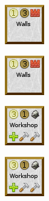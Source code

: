 \documentclass{article}
\begin{document}
\begin{figure}
\begin{subfigure}{}
    \includegraphics[scale=1]{../rules/png/doe_building_walls.png}
  \end{subfigure}
  \begin{subfigure}{}
    \includegraphics[scale=1]{../rules/png/doe_building_walls.png}
  \end{subfigure}
  \begin{subfigure}{}
    \includegraphics[scale=1]{../rules/png/doe_building_workshop.png}
  \end{subfigure}
  \begin{subfigure}{}
    \includegraphics[scale=1]{../rules/png/doe_building_workshop.png}
  \end{subfigure}
\end{figure}
\end{document}
